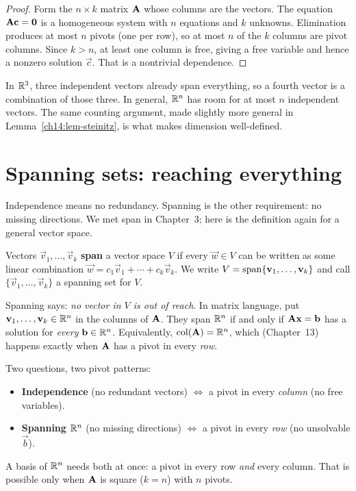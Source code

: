 \begin{proof}
Form the $n \times k$ matrix $\mathbf{A}$ whose columns are the vectors. The
equation $\mathbf{A}\mathbf{c} = \mathbf{0}$ is a homogeneous system with $n$ equations
and $k$ unknowns. Elimination produces at most $n$ pivots (one per row), so at
most $n$ of the $k$ columns are pivot columns. Since $k > n$, at least one column
is free, giving a free variable and hence a nonzero solution $\vec{c}$. That is a
nontrivial dependence.
\end{proof}

\begin{intuitionbox}
In $\mathbb{R}^3$, three independent vectors already span everything, so a fourth vector
is a combination of those three. In general, $\mathbb{R}^n$ has room for at most $n$
independent vectors. The same counting argument, made slightly more general in
Lemma~\ref{ch14:lem-steinitz}, is what makes dimension well-defined.
\end{intuitionbox}

\section{Spanning sets: reaching everything}
\label{ch14:span}

Independence means no redundancy. Spanning is the other requirement:
no missing directions. We met span in Chapter~3; here is the definition again
for a general vector space.

\begin{definition}
\label{ch14:def-span}
Vectors $\vec{v}_1,\dots,\vec{v}_k$ \textbf{span} a vector space $V$ if every
$\vec{w}\in V$ can be written as some linear combination
$\vec{w} = c_1\vec{v}_1 + \cdots + c_k\vec{v}_k$. We write $V = \operatorname{span}\{\mathbf{v}_1,
\dots,\mathbf{v}_k\}$ and call $\{\vec{v}_1,\dots,\vec{v}_k\}$ a spanning set for $V$.
\end{definition}

Spanning says: \emph{no vector in $V$ is out of reach}. In matrix language, put
$\mathbf{v}_1,\dots,\mathbf{v}_k\in\mathbb{R}^n$ in the columns of $\mathbf{A}$. They span $\mathbb{R}^n$ if and only if $\mathbf{A}\mathbf{x}=\mathbf{b}$
has a solution for \emph{every} $\mathbf{b}\in\mathbb{R}^n$. Equivalently, $\operatorname{col}(\mathbf{A})
= \mathbb{R}^n$, which (Chapter~13) happens exactly when $\mathbf{A}$ has a pivot in every
\emph{row}.

\begin{focusbox}
Two questions, two pivot patterns:
\begin{itemize}
  \item \textbf{Independence} (no redundant vectors) $\iff$ a pivot in every
        \emph{column} (no free variables).
  \item \textbf{Spanning} $\mathbb{R}^n$ (no missing directions) $\iff$ a pivot in every
        \emph{row} (no unsolvable $\vec{b}$).
\end{itemize}
A basis of $\mathbb{R}^n$ needs both at once: a pivot in every row \emph{and} every column.
That is possible only when $\mathbf{A}$ is square ($k=n$) with $n$ pivots.
\end{focusbox}

